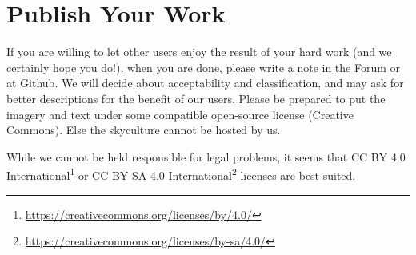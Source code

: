 \section{Publish Your Work}
\label{sec:skyculture:publish}

If you are willing to let other users enjoy the result of your hard
work (and we certainly hope you do!), when you are done, please write
a note in the Forum or at Github. We will decide about acceptability
and classification, and may ask for better descriptions for the
benefit of our users.  Please be prepared to put the imagery and text
under some compatible open-source license (Creative Commons). Else the
skyculture cannot be hosted by us.

While we cannot be held responsible for legal problems, it seems that
CC BY 4.0
International\footnote{\url{https://creativecommons.org/licenses/by/4.0/}}
or CC BY-SA 4.0
International\footnote{\url{https://creativecommons.org/licenses/by-sa/4.0/}}
licenses are best suited.



